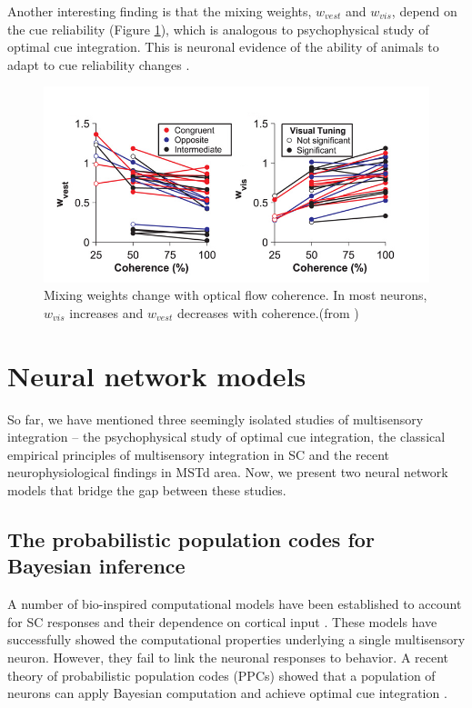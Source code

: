 \documentclass{article}[11pt]
\begin{document}
Another interesting finding is that the mixing weights, $w_{vest}$ and $w_{vis}$, depend on the cue reliability (Figure \ref{fig:weight}), which is analogous to psychophysical study of optimal cue integration.
This is neuronal evidence of the ability of animals to adapt to cue reliability changes .

\begin{figure}[tpb]
  \centering
  \includegraphics[width=.7\textwidth]{weight}
  \caption{Mixing weights change with optical flow coherence. In most neurons, $w_{vis}$ increases and $w_{vest}$ decreases with coherence.(from \cite{morgan_multisensory_2008})}
  \label{fig:weight}
\end{figure}


\section{Neural network models}
So far, we have mentioned three seemingly isolated studies of multisensory integration -- the psychophysical study of optimal cue integration, the classical empirical principles of multisensory integration in SC and the recent neurophysiological findings in MSTd area. Now, we present two neural network models that bridge the gap between these studies.

\subsection{The probabilistic population codes for Bayesian inference}
A number of bio-inspired computational models have been established to account for SC responses and their dependence on cortical input \cite{patton_modeling_2003, alvarado_neural_2008}. These models have successfully showed the computational properties underlying a single multisensory neuron. However, they fail to link the neuronal responses to behavior. A recent theory of probabilistic population codes (PPCs) showed that a population of neurons can apply Bayesian computation and achieve optimal cue integration \cite{ma_bayesian_2006}.
\end{document}
